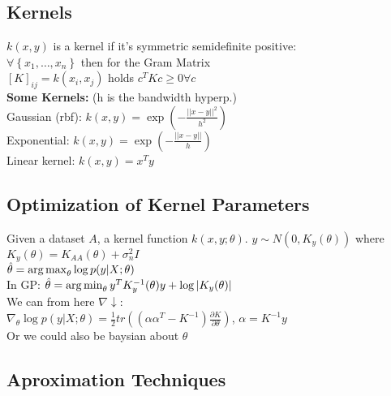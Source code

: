 
\subsection{Kernels}
	$k(x,y)$ is a kernel if it's symmetric semidefinite positive:\\
	$\forall \left\{x_1, \dots, x_n \right\}$ then for the Gram Matrix \\
	${\left[K\right]}_{ij}=k(x_i,x_j)$ holds $c^TKc\geq0\forall c$\\
    \textbf{Some Kernels:} (h is the bandwidth hyperp.)\\
    Gaussian (rbf): $k(x,y) = \exp( -\tfrac{||x-y||^2}{h^2})$\\
    Exponential: $k(x,y) = \exp( -\tfrac{||x-y||}{h})$\\
    Linear kernel: $k(x,y) = x^Ty$\\
\subsection{Optimization of Kernel Parameters}
Given a dataset $A$, a kernel function $k(x,y;\theta)$. $y\sim N(0, K_y(\theta))$ where $K_y(\theta)=K_{AA}(\theta)+\sigma_n^2I$\\
$\hat\theta = \operatorname*{arg\,max}_\theta \log p(y\vert X;\theta)$\\ 
In GP: $\hat\theta=\operatorname*{arg\,min}_\theta y^TK_{y}^{-1}(\theta)y + \log\vert K_y(\theta)\vert$\\
We can from here $\nabla\downarrow$:\\
$\nabla_\theta \log p(y\vert X;\theta) = ${\scriptsize$\frac{1}{2}tr\left(\left(\alpha\alpha^T-K^{-1}\right)\frac{\partial K}{\partial \theta}\right)$, $\alpha = K^{-1}y$}\\
Or we could also be baysian about $\theta$
\subsection{Aproximation Techniques}


